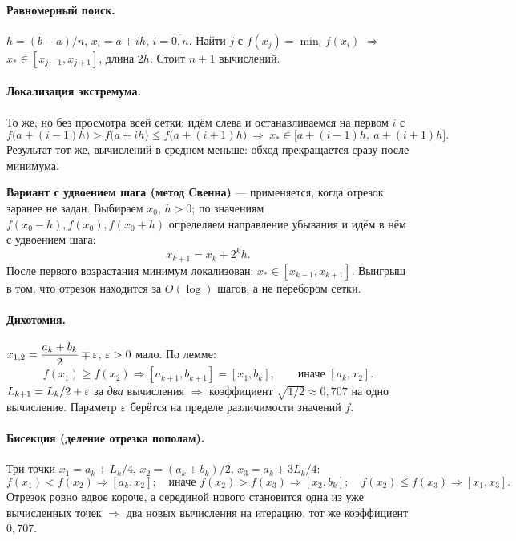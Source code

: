 \paragraph{Равномерный поиск.}
$h = (b-a)/n$, $x_i = a + ih$, $i = \overline{0,n}$. Найти $j$ с
$f(x_j) = \min_i f(x_i)$ $\Rightarrow$ $x_* \in [x_{j-1}, x_{j+1}]$, длина
$2h$. Стоит $n+1$ вычислений.

\paragraph{Локализация экстремума.}
То же, но без просмотра всей сетки: идём слева и останавливаемся на первом
$i$ с
\[
  f\big(a+(i-1)h\big) > f\big(a+ih\big) \le f\big(a+(i+1)h\big)
  \ \Rightarrow\ x_* \in \big[a+(i-1)h,\ a+(i+1)h\big] .
\]
Результат тот же, вычислений в среднем меньше: обход прекращается сразу
после минимума.

\textbf{Вариант с удвоением шага (метод Свенна)} — применяется, когда отрезок
заранее не задан. Выбираем $x_0$, $h > 0$; по значениям
$f(x_0-h), f(x_0), f(x_0+h)$ определяем направление убывания и идём в нём с
удвоением шага:
\[
  x_{k+1} = x_k + 2^k h .
\]
После первого возрастания минимум локализован: $x_* \in [x_{k-1}, x_{k+1}]$.
Выигрыш в том, что отрезок находится за $O(\log)$ шагов, а не перебором сетки.

\paragraph{Дихотомия.}
$x_{1,2} = \dfrac{a_k+b_k}{2} \mp \varepsilon$, $\varepsilon > 0$ мало. По лемме:
\[
  f(x_1) \ge f(x_2) \Rightarrow [a_{k+1},b_{k+1}] = [x_1, b_k] ,
  \qquad
  \text{иначе } [a_k, x_2] .
\]
$L_{k+1} = L_k/2 + \varepsilon$ за \emph{два} вычисления $\Rightarrow$ коэффициент
$\sqrt{1/2} \approx 0{,}707$ на одно вычисление. Параметр $\varepsilon$ берётся на
пределе различимости значений $f$.

\paragraph{Бисекция (деление отрезка пополам).}
Три точки $x_1 = a_k + L_k/4$, $x_2 = (a_k+b_k)/2$, $x_3 = a_k + 3L_k/4$:
\[
  f(x_1) < f(x_2) \Rightarrow [a_k, x_2] ; \quad
  \text{иначе } f(x_2) > f(x_3) \Rightarrow [x_2, b_k] ; \quad
  f(x_2) \le f(x_3) \Rightarrow [x_1, x_3] .
\]
Отрезок ровно вдвое короче, а серединой нового становится одна из уже
вычисленных точек $\Rightarrow$ два новых вычисления на итерацию, тот же
коэффициент $0{,}707$.

